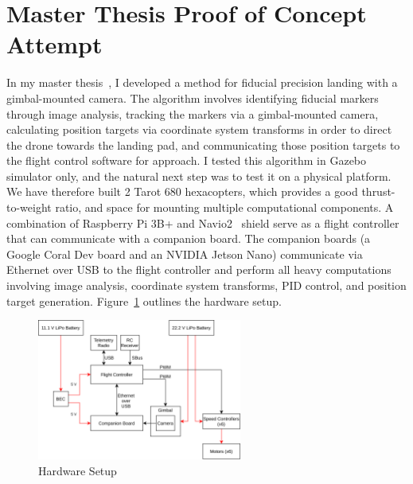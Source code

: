 \section{Master Thesis Proof of Concept Attempt}
\label{section:initial_hexacopters}

In my master thesis~\cite{joshua_master_thesis}, I developed a method for fiducial precision landing with a gimbal-mounted camera.
The algorithm involves identifying fiducial markers through image analysis,
tracking the markers via a gimbal-mounted camera,
calculating position targets via coordinate system transforms in order to direct the drone towards the landing pad,
and communicating those position targets to the flight control software for approach.
I tested this algorithm in Gazebo simulator only, and the natural next step was to test it on a physical platform.
We have therefore built 2 Tarot 680 hexacopters,
which provides a good thrust-to-weight ratio,
and space for mounting multiple computational components.
A combination of Raspberry Pi 3B+ and Navio2~\cite{navio2_website} shield serve as a flight controller
that can communicate with a companion board.
The companion boards (a Google Coral Dev board and an NVIDIA Jetson Nano) communicate via Ethernet over USB to the flight
controller and perform all heavy computations involving image analysis, coordinate system transforms, PID control,
and position target generation.
Figure~\ref{figure:hardware_setup} outlines the hardware setup.

\begin{figure}
    \centering
    \includegraphics[width=0.6\textwidth]{images/hardware.png}
    \caption{Hardware Setup}
    \label{figure:hardware_setup}
\end{figure}

